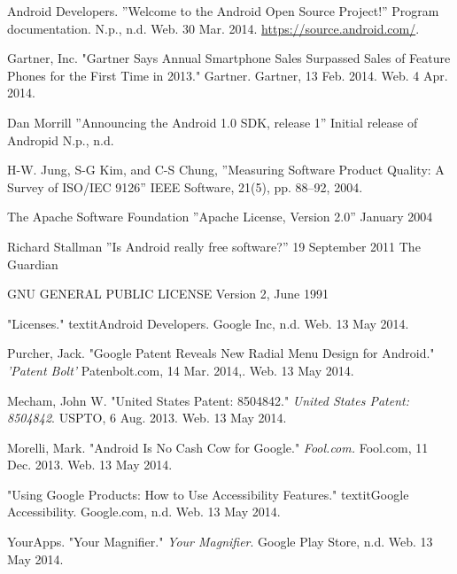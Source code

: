 \documentclass[conference]{IEEEtran}
\begin{document}
\begin{thebibliography}{1}


Android Developers. ''Welcome to the Android Open Source Project!'' Program documentation. N.p., n.d. Web. 30 Mar. 2014. \url{https://source.android.com/}.

Gartner, Inc. "Gartner Says Annual Smartphone Sales Surpassed Sales of Feature Phones for the First Time in 2013." Gartner. Gartner, 13 Feb. 2014. Web. 4 Apr. 2014.

Dan Morrill ''Announcing the Android 1.0 SDK, release 1'' Initial release of Andropid N.p., n.d. 

H-W. Jung, S-G Kim, and C-S Chung, ''Measuring Software Product Quality: A Survey of ISO/IEC 9126'' IEEE Software, 21(5), pp. 88--92, 2004.

The Apache Software Foundation ''Apache License, Version 2.0'' January 2004

Richard Stallman ''Is Android really free software?'' 19 September 2011 The Guardian

GNU GENERAL PUBLIC LICENSE Version 2, June 1991

"Licenses." textit{Android Developers}. Google Inc, n.d. Web. 13 May 2014.

Purcher, Jack. "Google Patent Reveals New Radial Menu Design for Android." \textit{'Patent Bolt'} Patenbolt.com, 14 Mar. 2014,. Web. 13 May 2014.

Mecham, John W. "United States Patent: 8504842." \textit{United States Patent: 8504842}. USPTO, 6 Aug. 2013. Web. 13 May 2014.

Morelli, Mark. "Android Is No Cash Cow for Google." \textit{Fool.com.} Fool.com, 11 Dec. 2013. Web. 13 May 2014.

"Using Google Products: How to Use Accessibility Features." textit{Google Accessibility}. Google.com, n.d. Web. 13 May 2014.

YourApps. "Your Magnifier." \textit{Your Magnifier}. Google Play Store, n.d. Web. 13 May 2014.


\end{thebibliography}
\end{document}
